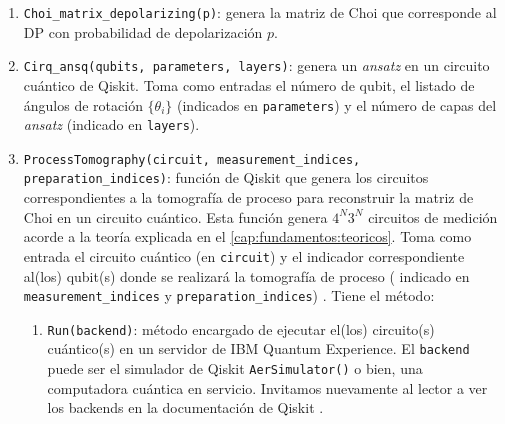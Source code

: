 \documentclass[letterpaper,12pt]{thesisECFM}
\theoremstyle{plain}
\theoremstyle{definition}
\theoremstyle{definition}
\theoremstyle{remark}
\newcommand{\1}{\mathbb{1}}
\begin{document}
\begin{enumerate}
    \item \texttt{Choi\_matrix\_depolarizing(p)}: genera la matriz de Choi que
corresponde al DP con probabilidad de depolarización $p$.

    \item \texttt{Cirq\_ansq(qubits, parameters, layers)}: genera un \textit{ansatz} en
un circuito cuántico de Qiskit. Toma como entradas el número de
 qubit, el listado de ángulos de rotación $\{\theta_i\}$ (indicados en
\texttt{parameters}) y el número de capas del \textit{ansatz} (indicado en
\texttt{layers}).

    \item \texttt{ProcessTomography(circuit, measurement\_indices,
preparation\_indices)}: función de Qiskit que genera los circuitos
correspondientes a la tomografía de proceso para reconstruir la matriz de Choi
en un circuito cuántico. Esta función genera $4^N3^N$ circuitos de medición
acorde a la teoría explicada en el \autoref{cap:fundamentos:teoricos}. Toma como entrada el circuito
cuántico (en  \texttt{circuit})  y el indicador correspondiente al(los)
qubit(s) donde se realizará la tomografía de proceso ( indicado en
\texttt{measurement\_indices} y \texttt{preparation\_indices}) . Tiene el
método: 
    \begin{enumerate}
	\item \texttt{Run(backend)}: método encargado de ejecutar el(los)
circuito(s) cuántico(s) en un servidor de IBM Quantum Experience. El
\texttt{backend} puede ser el simulador de Qiskit  \texttt{AerSimulator()} o
bien, una computadora cuántica en servicio. Invitamos nuevamente al lector a
ver los backends en la documentación de Qiskit \cite{Qiskit_documentation}. 
    \end{enumerate}


\end{enumerate}
\end{document}
